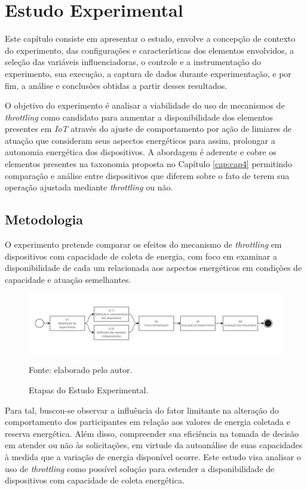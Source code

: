 \chapter{Estudo Experimental}
\label{cap:cap6}

Este capítulo consiste em apresentar o estudo, envolve a concepção de contexto do experimento, das configurações e características dos elementos envolvidos, a seleção das variáveis influenciadoras, o controle e a instrumentação do experimento, sua execução, a captura de dados durante experimentação, e por fim, a análise e conclusões obtidas a partir desses resultados. 

O objetivo do experimento é analisar a viabilidade do uso de mecanismos de \textit{throttling} como candidato para aumentar a disponibilidade dos elementos presentes em \textit{IoT} através do ajuste de comportamento por ação de limiares de atuação que consideram seus aspectos energéticos para assim,  prolongar a autonomia energética dos dispositivos. A abordagem é aderente e cobre os elementos presentes na taxonomia proposta no Capítulo \ref{cap:cap4} permitindo comparação e análise entre dispositivos que diferem sobre o fato de terem sua operação ajustada mediante \textit{throttling} ou não. 

\section{Metodologia}

O experimento pretende comparar os efeitos do mecanismo de \textit{throttling} em dispositivos com capacidade de coleta de energia, com foco em examinar a disponibilidade de cada um relacionada aos aspectos energéticos em condições de capacidade e atuação semelhantes.

\begin{figure}[H]
	\centering
	\caption{Etapas do Estudo Experimental.}
	\label{fig:cap6metodologia}
	\includegraphics[width=1\linewidth]{Imagens/cap6/cap6metodologia.jpg}
	
	Fonte: elaborado pelo autor.
\end{figure} 

Para tal, buscou-se observar a influência do fator limitante na alteração do comportamento dos participantes em relação aos valores de energia coletada e reserva energética. Além disso, compreender sua eficiência na tomada de decisão em atender ou não às solicitações, em virtude da autoanálise de suas capacidades à medida que a variação de energia disponível ocorre. Este estudo visa analisar o uso de \textit{throttling} como possível solução para estender a disponibilidade de dispositivos com capacidade de coleta energética. 

